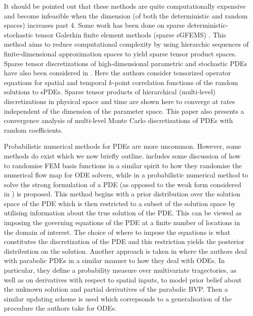 It should be pointed out that these methods are quite computationally expensive and become infeasible when the dimension (of both the deterministic and random spaces) increases past 4. Some work has been done on sparse deterministic-stochastic tensor Galerkin finite element methods (sparse sGFEMS) \textcolor{blue}{\citep{bieri2010sparse}}. This method aims to reduce computational complexity by using hierarchic sequences of finite-dimensional approximation spaces to yield sparse tensor product spaces. Sparse tensor discretizations of high-dimensional parametric and stochastic PDEs have also been considered in \textcolor{blue}{\citep{schwab2011sparse}}. Here the authors consider tensorized operator equations for spatial and temporal $k$-point correlation functions of the random solutions to sPDEs. Sparse tensor products of hierarchical (multi-level) discretizations in physical space and time are shown here to converge at rates independent of the dimension of the parameter space. This paper also presents a convergence analysis of multi-level Monte Carlo discretizations of PDEs with random coefficients.

Probabilistic numerical methods for PDEs are more uncommon. However, some methods do exist which we now briefly outline. \textcolor{blue}{\citep{conrad2017statistical}} includes some discussion of how to randomise FEM basis functions in a similar spirit to how they randomise the numerical flow map for ODE solvers, while in \textcolor{blue}{\citep{cockayne2016probabilistic}} a probabilistic numerical method to solve the strong formulation of a PDE (as opposed to the weak form considered in \textcolor{blue}{\citep{conrad2017statistical}}) is proposed. This method begins with a prior distribution over the solution space of the PDE which is then restricted to a subset of the solution space by utilising information about the true solution of the PDE. This can be viewed as imposing the governing equations of the PDE at a finite number of locations in the domain of interest. The choice of where to impose the equations is what constitutes the discretization of the PDE and this restriction yields the posterior distribution on the solution. Another approach is taken in \textcolor{blue}{\citep{chkrebtii2016bayesian}} where the authors deal with parabolic PDEs in a similar manner to how they deal with ODEs. In particular, they define a probability measure over multivariate tragectories, as well as on derivatives with respect to spatial inputs, to model prior belief about the unknown solution and partial derivatives of the parabolic BVP. Then a similar updating scheme is used which correpsonds to a generalisation of the procedure the authors take for ODEs.

